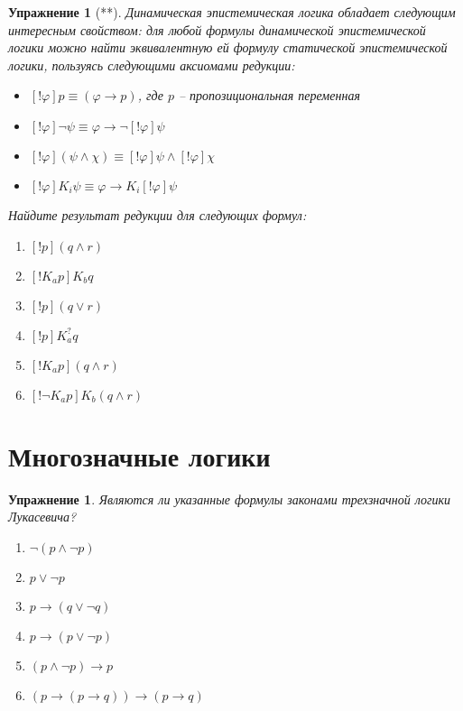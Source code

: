 \documentclass[11pt]{article}
\newtheorem{exercise}[theorem]{Упражнение}
\begin{document}
\begin{exercise}[**] Динамическая эпистемическая логика обладает следующим интересным свойством: для любой формулы динамической эпистемической логики можно найти эквивалентную ей формулу статической эпистемической логики, пользуясь следующими аксиомами редукции:
\begin{itemize}
\item $[!\varphi]p \equiv ( \varphi \to p)$, где $p$ – пропозициональная переменная 
\item $[! \varphi] \neg \psi \equiv  \varphi \to \neg [!\varphi]\psi$ 
\item $[!\varphi]( \psi \wedge \chi)\equiv [!\varphi]\psi \wedge [!\varphi]\chi $ 
\item $[! \varphi] K_i \psi \equiv \varphi \to K_i[!\varphi]\psi $ 
\end{itemize} 

Найдите результат редукции для следующих формул:
\begin{multicols}{3}
\begin{enumerate}
\item $ [!p] (q \wedge  r) $
\item $ [!K_a p] K_b q$
\item $ [!p] (q \vee r) $
\item $ [!p] K^{?}_a q $
\item $[!K_a p] (q \wedge r)$		
\item $[! \neg K_a p] K_b (q \wedge r)$	
\end{enumerate}
\end{multicols}

\end{exercise}



\section{Многозначные логики}

\begin{exercise} Являются ли указанные формулы законами трехзначной логики Лукасевича?  
\begin{multicols}{2}
\begin{enumerate}
	\item $\neg (p \wedge \neg p)$
	\item $p \vee \neg p$
	\item $p \to (q \vee \neg q)$
	\item $p \to (p \vee \neg p)$
	\item $(p \wedge \neg p) \to p$
	\item $(p \to (p \to q)) \to (p \to q)$
\end{enumerate}
\end{multicols}
\end{exercise}
\end{document}
